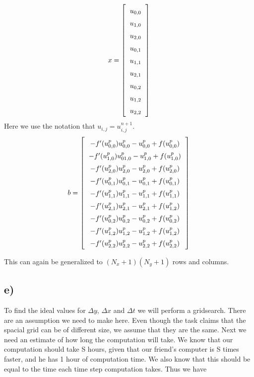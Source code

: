 \documentclass[norsk,a4paper,12pt]{scrartcl}
\begin{document}
\begin{equation*}
\renewcommand{\arraystretch}{1.5}
  \setlength{\arraycolsep}{6pt}
    x = \left[\begin{array}{c}
    u_{0, 0}\\
    u_{1, 0}\\
    u_{2,0}\\
    u_{0,1}\\
    u_{1,1}\\
    u_{2,1}\\
    u_{0,2}\\
    u_{1,2}\\
    u_{2,2}\\
\end{array}\right]
\end{equation*}
Here we use the notation that $u_{i,j} = u_{i,j}^{n+1}$. 
\begin{equation*}
\renewcommand{\arraystretch}{1.5}
  \setlength{\arraycolsep}{6pt}
    b = \left[\begin{array}{c}
    -f'(u_{0,0}^p)u_{0,0}^p - u_{0, 0}^p + f(u_{0,0}^p)\\
    -f'(u_{1,0}^p)u_{01,0}^p - u_{1, 0}^p+ f(u_{1,0}^p)\\
    -f'(u_{2,0}^p)u_{2,0}^p -u_{2,0}^p+ f(u_{2,0}^p)\\
    -f'(u_{0,1}^p)u_{0,1}^p - u_{0,1}^p+ f(u_{0,1}^p)\\
    -f'(u_{1,1}^p)u_{1,1}^p -u_{1,1}^p+ f(u_{1,1}^p)\\
    -f'(u_{2,1}^p)u_{2,1}^p -u_{2,1}^p+ f(u_{1,2}^p)\\
    -f'(u_{0,2}^p)u_{0,2}^p -u_{0,2}^p+ f(u_{0,2}^p)\\
    -f'(u_{1,2}^p)u_{1,2}^p -u_{1,2}^p+ f(u_{1,2}^p)\\
    -f'(u_{2,2}^p)u_{2,2}^p -u_{2,2}^p+ f(u_{2,2}^p)\\
\end{array}\right]
\end{equation*}

This can again be generalized to $(N_x+1)(N_y+1)$ rows and columns.


\subsection{e)}
To find the ideal values for $\Delta y$, $\Delta x$ and $\Delta t$ we will perform a gridsearch. There are an assumption we need to make here. Even though the task claims that the spacial grid can be of different size, we assume that they are the same. Next we need an estimate of how long the computation will take. We know that our computation should take S hours, given that our friend's computer is S times faster, and he has 1 hour of computation time. We also know that this should be equal to the time each time step computation takes. Thus we have
\end{document}
